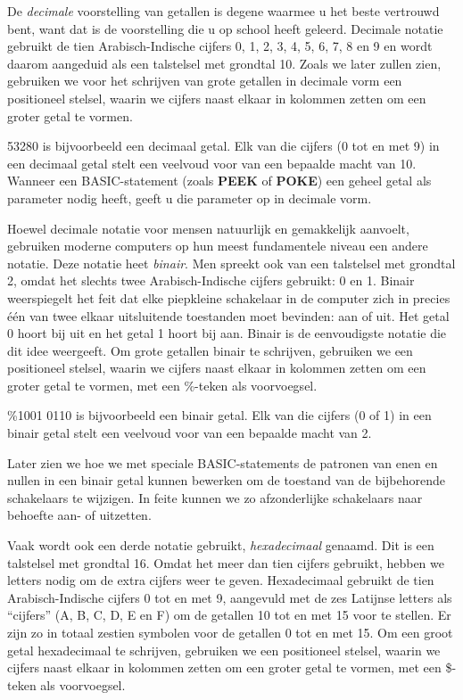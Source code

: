 De {\it decimale} voorstelling van getallen is degene waarmee u het beste vertrouwd bent, want dat is de voorstelling die u op school heeft geleerd. Decimale notatie gebruikt de tien Arabisch-Indische cijfers 0, 1, 2, 3, 4, 5, 6, 7, 8 en 9 en wordt daarom aangeduid als een talstelsel met grondtal 10. Zoals we later zullen zien, gebruiken we voor het schrijven van grote getallen in decimale vorm een positioneel stelsel, waarin we cijfers naast elkaar in kolommen zetten om een groter getal te vormen.

53280 is bijvoorbeeld een decimaal getal. Elk van die cijfers (0 tot en met 9) in een decimaal getal stelt een veelvoud voor van een bepaalde macht van 10. Wanneer een BASIC-statement (zoals {\bf PEEK} of {\bf POKE}) een geheel getal als parameter nodig heeft, geeft u die parameter op in decimale vorm.

Hoewel decimale notatie voor mensen natuurlijk en gemakkelijk aanvoelt, gebruiken moderne computers op hun meest fundamentele niveau een andere notatie. Deze notatie heet {\it binair}. Men spreekt ook van een talstelsel met grondtal 2, omdat het slechts twee Arabisch-Indische cijfers gebruikt: 0 en 1. Binair weerspiegelt het feit dat elke piepkleine schakelaar in de computer zich in precies één van twee elkaar uitsluitende toestanden moet bevinden: aan of uit. Het getal 0 hoort bij uit en het getal 1 hoort bij aan. Binair is de eenvoudigste notatie die dit idee weergeeft. Om grote getallen binair te schrijven, gebruiken we een positioneel stelsel, waarin we cijfers naast elkaar in kolommen zetten om een groter getal te vormen, met een \%-teken als voorvoegsel.

\%1001 0110 is bijvoorbeeld een binair getal. Elk van die cijfers (0 of 1) in een binair getal stelt een veelvoud voor van een bepaalde macht van 2.

Later zien we hoe we met speciale BASIC-statements de patronen van enen en nullen in een binair getal kunnen bewerken om de toestand van de bijbehorende schakelaars te wijzigen. In feite kunnen we zo afzonderlijke schakelaars naar behoefte aan- of uitzetten.

Vaak wordt ook een derde notatie gebruikt, {\it hexadecimaal} genaamd. Dit is een talstelsel met grondtal 16. Omdat het meer dan tien cijfers gebruikt, hebben we letters nodig om de extra cijfers weer te geven. Hexadecimaal gebruikt de tien Arabisch-Indische cijfers 0 tot en met 9, aangevuld met de zes Latijnse letters als ``cijfers'' (A, B, C, D, E en F) om de getallen 10 tot en met 15 voor te stellen. Er zijn zo in totaal zestien symbolen voor de getallen 0 tot en met 15. Om een groot getal hexadecimaal te schrijven, gebruiken we een positioneel stelsel, waarin we cijfers naast elkaar in kolommen zetten om een groter getal te vormen, met een \$-teken als voorvoegsel.


